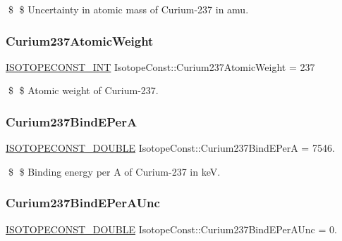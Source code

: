 \$ \$ Uncertainty in atomic mass of Curium-\/237 in amu. \mbox{\label{group___isotope_const-_curium-_cm237_gacb97c0ea6a25d547cc3e34d83370d08c}} 
\subsubsection{\texorpdfstring{Curium237\+Atomic\+Weight}{Curium237AtomicWeight}}
{\footnotesize\ttfamily \mbox{\hyperlink{group___isotope_const-_macros_ga5f18360b3e99483a35c32d789e62621c}{I\+S\+O\+T\+O\+P\+E\+C\+O\+N\+S\+T\+\_\+\+I\+NT}} Isotope\+Const\+::\+Curium237\+Atomic\+Weight = 237}

\$ \$ Atomic weight of Curium-\/237. \mbox{\label{group___isotope_const-_curium-_cm237_gaff3512c46c4949dd78eb1af94f7f2c92}} 
\subsubsection{\texorpdfstring{Curium237\+Bind\+E\+PerA}{Curium237BindEPerA}}
{\footnotesize\ttfamily \mbox{\hyperlink{group___isotope_const-_macros_ga8f45a7272ce02c0b4c65c44636ed719a}{I\+S\+O\+T\+O\+P\+E\+C\+O\+N\+S\+T\+\_\+\+D\+O\+U\+B\+LE}} Isotope\+Const\+::\+Curium237\+Bind\+E\+PerA = 7546.}

\$ \$ Binding energy per A of Curium-\/237 in keV. \mbox{\label{group___isotope_const-_curium-_cm237_gaa8ce62d70d4ecdc65182340dd23a349f}} 
\subsubsection{\texorpdfstring{Curium237\+Bind\+E\+Per\+A\+Unc}{Curium237BindEPerAUnc}}
{\footnotesize\ttfamily \mbox{\hyperlink{group___isotope_const-_macros_ga8f45a7272ce02c0b4c65c44636ed719a}{I\+S\+O\+T\+O\+P\+E\+C\+O\+N\+S\+T\+\_\+\+D\+O\+U\+B\+LE}} Isotope\+Const\+::\+Curium237\+Bind\+E\+Per\+A\+Unc = 0.}

